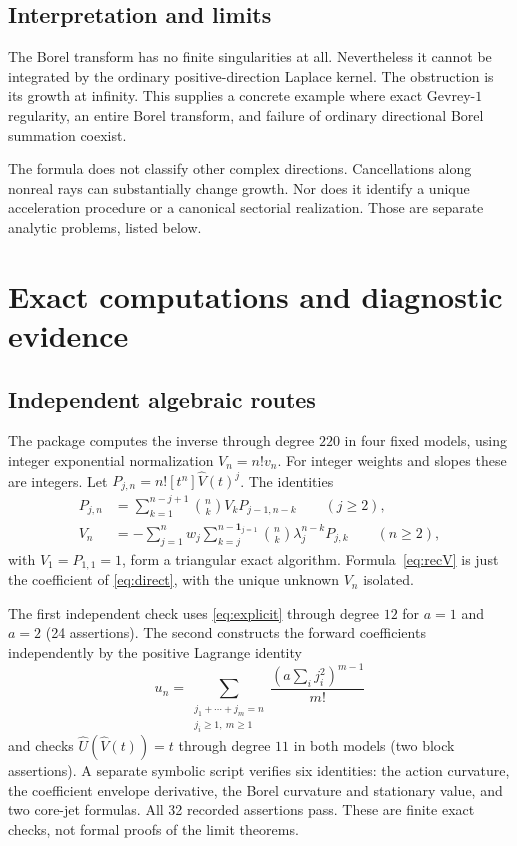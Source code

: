 \documentclass[11pt,a4paper]{article}
\numberwithin{equation}{section}
\theoremstyle{definition}
\theoremstyle{remark}\newtheorem{remark}[theorem]{Remark}
\newcommand{\U}{\widehat U}\newcommand{\V}{\widehat V}
\begin{document}
\subsection{Interpretation and limits}
The Borel transform has no finite singularities at all. Nevertheless it
cannot be integrated by the ordinary positive-direction Laplace kernel.
The obstruction is its growth at infinity. This supplies a concrete example
where exact Gevrey-$1$ regularity, an entire Borel transform, and failure of
ordinary directional Borel summation coexist.

The formula does not classify other complex directions. Cancellations along
nonreal rays can substantially change growth. Nor does it identify a unique
acceleration procedure or a canonical sectorial realization. Those are
separate analytic problems, listed below.

\section{Exact computations and diagnostic evidence}
\label{sec:computation}

\subsection{Independent algebraic routes}
The package computes the inverse through degree $220$ in four fixed models,
using integer exponential normalization
$V_n=n!v_n$. For integer weights and slopes these are integers.
Let $P_{j,n}=n![t^n]\V(t)^j$. The identities
\begin{align}
 P_{j,n}&=\sum_{k=1}^{n-j+1}\binom nk V_kP_{j-1,n-k}
 \qquad(j\ge2),\label{eq:recP}\\
 V_n&=-\sum_{j=1}^n w_j
 \sum_{k=j}^{n-\mathbf1_{j=1}}
 \binom nk\lambda_j^{n-k}P_{j,k}
 \qquad(n\ge2),\label{eq:recV}
\end{align}
with $V_1=P_{1,1}=1$, form a triangular exact algorithm.
Formula~\eqref{eq:recV} is just the coefficient of \eqref{eq:direct}, with
the unique unknown $V_n$ isolated.

The first independent check uses \eqref{eq:explicit} through degree $12$
for $a=1$ and $a=2$ (24 assertions). The second constructs the forward
coefficients independently by the positive Lagrange identity
\begin{equation}
 u_n=\sum_{\substack{j_1+\cdots+j_m=n\\j_i\ge1,\ m\ge1}}
 \frac{(a\sum_i j_i^2)^{m-1}}{m!}
 \label{eq:forward-exact}
\end{equation}
and checks $\U(\V(t))=t$ through degree $11$ in both models (two block
assertions). A separate symbolic script verifies six identities: the action
curvature, the coefficient envelope derivative, the Borel curvature and
stationary value, and two core-jet formulas. All 32 recorded assertions pass.
These are finite exact checks, not formal proofs of the limit theorems.
\end{document}
